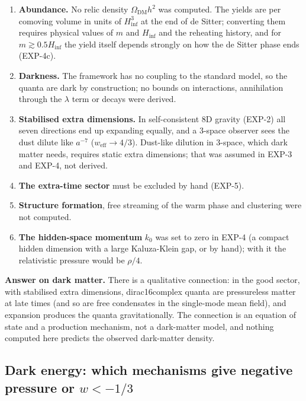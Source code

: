\documentclass[11pt]{article}
\begin{document}
\begin{enumerate}
\item \textbf{Abundance.} No relic density $\Omega_{\mathrm{DM}}h^2$ was computed. The yields are per comoving volume in units of $H_{\mathrm{inf}}^3$ at the end of de Sitter; converting them requires physical values of $m$ and $H_{\mathrm{inf}}$ and the reheating history, and for $m\gtrsim0.5H_{\mathrm{inf}}$ the yield itself depends strongly on how the de Sitter phase ends (EXP-4c).
\item \textbf{Darkness.} The framework has no coupling to the standard model, so the quanta are dark by construction; no bounds on interactions, annihilation through the $\lambda$ term or decays were derived.
\item \textbf{Stabilised extra dimensions.} In self-consistent 8D gravity (EXP-2) all seven directions end up expanding equally, and a 3-space observer sees the dust dilute like $a^{-7}$ ($w_{\mathrm{eff}}\to4/3$). Dust-like dilution in 3-space, which dark matter needs, requires static extra dimensions; that was assumed in EXP-3 and EXP-4, not derived.
\item \textbf{The extra-time sector} must be excluded by hand (EXP-5).
\item \textbf{Structure formation}, free streaming of the warm phase and clustering were not computed.
\item \textbf{The hidden-space momentum} $k_0$ was set to zero in EXP-4 (a compact hidden dimension with a large Kaluza-Klein gap, or by hand); with it the relativistic pressure would be $\rho/4$.
\end{enumerate}

\textbf{Answer on dark matter.} There is a qualitative connection: in the good sector, with stabilised extra dimensions, dirac16complex quanta are pressureless matter at late times (and so are free condensates in the single-mode mean field), and expansion produces the quanta gravitationally. The connection is an equation of state and a production mechanism, not a dark-matter model, and nothing computed here predicts the observed dark-matter density.

\subsection{Dark energy: which mechanisms give negative pressure or \texorpdfstring{$w<-1/3$}{w<-1/3}}
\end{document}
